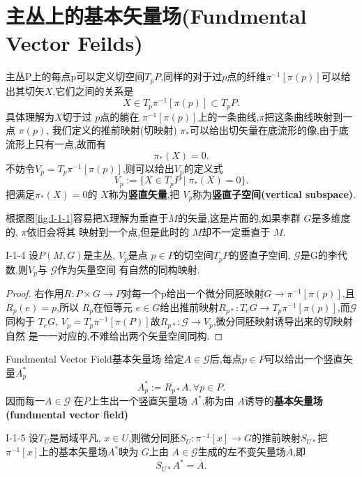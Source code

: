 \documentclass[../main.tex]{subfiles}
\begin{document}
 \section{主丛上的基本矢量场(Fundmental Vector Feilds)}
 主丛P上的每点p可以定义切空间$T_pP$,同样的对于过$p$点的纤维$\pi^{-1}[\pi(p)]$可以给出其切矢$X$,它们之间的关系是
 \[
   X \in T_p\pi^{-1}[\pi(p)] \subset T_pP
 .\] 
 具体理解为$X$切于过 $p$点的躺在 $\pi^{-1}[\pi(p)]$上的一条曲线,$\pi$把这条曲线映射到一点 $\pi(p)$,
 我们定义的推前映射(切映射) $\pi_*$可以给出切矢量在底流形的像,由于底流形上只有一点,故而有 \[
   \pi_*(X) = 0
 .\] 
 不妨令$V_p = T_p\pi^{-1}[\pi(p)]$,则可以给出$V_p$的定义式 \[
   V_p := \{X \in T_pP  \mid  \pi_*(X) = 0\}
 .\] 
 把满足$\pi_*(X) = 0$的 $X$称为\textbf{竖直矢量},把 $V_p$称为\textbf{竖直子空间(vertical subspace)}.
 \begin{note}
   根据图\ref{fig:I-1-1}容易把X理解为垂直于$M$的矢量,这是片面的,如果李群 $G$是多维度的, $\pi$依旧会将其
   映射到一个点,但是此时的 $M$却不一定垂直于 $M$.
 \end{note}
 \begin{theorem}
   {}{I-1-4}
   设$P(M,G)$是主丛, $V_p$是点 $p \in  P$的切空间$T_pP$的竖直子空间, $\mathscr{G}$是G的李代数,则$V_p$与 $\mathscr{G}$作为矢量空间
   有自然的同构映射.
 \end{theorem}
 \begin{proof}
   右作用$R:P \times G \to P$对每一个p给出一个微分同胚映射$G \to \pi^{-1}[\pi(p)]$,且$R_p(e) = p$,所以
   $R_p$在恒等元 $e \in G$给出推前映射$R_{p*} :T_eG \to T_p \pi^{-1}[\pi(p)]$,而$\mathscr{G}$同构于
   $T_eG$, $V_p = T_p\pi^{-1}[\pi(P)]$故$R_{p*} : \mathscr{G}\to V_p$,微分同胚映射诱导出来的切映射自然
   是一一对应的,不难给出两个矢量空间同构.
 \end{proof}
 \begin{definition}
   {Fundmental Vector Field}{基本矢量场}
   给定$A\in \mathscr{G}$后,每点$p \in P$可以给出一个竖直矢量$A^*_p$ \[
     A^*_p := R_{p*} A , \forall p \in P
   .\] 
   因而每一$A\in \mathscr{G}$ 在$P$上生出一个竖直矢量场 $A^*$,称为由 $A$诱导的\textbf{基本矢量场(fundmental vector field)}
 \end{definition}
 \begin{theorem}
   {}{I-1-5}
   设$T_U$是局域平凡, $x\in U$,则微分同胚$S_U:\pi^{-1}[x] \to G$的推前映射$S_{U*}$把 $\pi^{-1}[x]$上的基本矢量场$A^*$映为 $G$上由 $A \in \mathscr{G}$生成的左不变矢量场$\overline{A}$,即
   \[
     S_{U*}A^* = \overline{A}
   .\] 
 \end{theorem}
\end{document}
